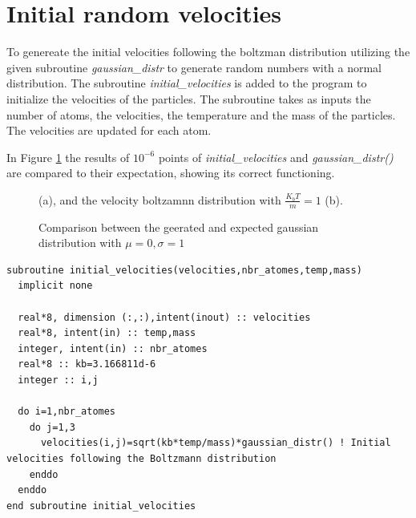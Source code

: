 \documentclass{cis320}
\begin{document}
\section{Initial random velocities}
To genereate the initial velocities following the boltzman distribution utilizing the given subroutine \textit{gaussian\_distr} to generate random numbers with a normal distribution. The subroutine \textit{initial\_velocities} is added to the program to initialize the velocities of the particles. The subroutine takes as inputs the number of atoms, the velocities, the temperature and the mass of the particles. The velocities are updated for each atom.\\
\par
In Figure \ref{fig:dist} the results of $10^{-6}$ points of \textit{initial\_velocities} and \textit{gaussian\_distr()} are compared to their expectation, showing its correct functioning.\\

\begin{figure}[h]
    \centering
    \caption{Comparison between the geerated and expected gaussian distribution with $\mu=0,\sigma=1$}(a), and the velocity boltzamnn distribution with $\frac{K_bT}{m}=1$ (b).
    \label{fig:dist}
\end{figure}

\begin{lstlisting}[caption=Velocity initalization]
subroutine initial_velocities(velocities,nbr_atomes,temp,mass)
  implicit none

  real*8, dimension (:,:),intent(inout) :: velocities 
  real*8, intent(in) :: temp,mass
  integer, intent(in) :: nbr_atomes
  real*8 :: kb=3.166811d-6
  integer :: i,j

  do i=1,nbr_atomes
    do j=1,3
      velocities(i,j)=sqrt(kb*temp/mass)*gaussian_distr() ! Initial velocities following the Boltzmann distribution
    enddo
  enddo
end subroutine initial_velocities \end{lstlisting}
\end{document}
